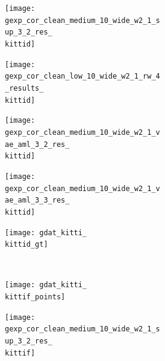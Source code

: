 \begin{figure}[t]
{\begin{subfigure}[t]{0.5\textwidth}
\begin{subfigure}[t]{0.15\textwidth}
			\vspace{0px}\centering
			\texttt{[image: gexp\_cor\_clean\_medium\_10\_wide\_w2\_1\_sup\_3\_2\_res\_\\kittid]}
		\end{subfigure}
		\begin{subfigure}[t]{0.15\textwidth}
			\vspace{0px}\centering
			\texttt{[image: gexp\_cor\_clean\_low\_10\_wide\_w2\_1\_rw\_4\_results\_\\kittid]}
		\end{subfigure}
		\begin{subfigure}[t]{0.15\textwidth}
			\vspace{0px}\centering
			\texttt{[image: gexp\_cor\_clean\_medium\_10\_wide\_w2\_1\_vae\_aml\_3\_2\_res\_\\kittid]}
		\end{subfigure}
		\begin{subfigure}[t]{0.15\textwidth}
			\vspace{0px}\centering
			\texttt{[image: gexp\_cor\_clean\_medium\_10\_wide\_w2\_1\_vae\_aml\_3\_3\_res\_\\kittid]}
		\end{subfigure}
		\begin{subfigure}[t]{0.15\textwidth}
			\vspace{0px}\centering
			\texttt{[image: gdat\_kitti\_\\kittid\_gt]}
		\end{subfigure}
		\\ %
		\begin{subfigure}[t]{0.15\textwidth}
			\vspace{0px}\centering
			\texttt{[image: gdat\_kitti\_\\kittif\_points]}
		\end{subfigure}
		\begin{subfigure}[t]{0.15\textwidth}
			\vspace{0px}\centering
			\texttt{[image: gexp\_cor\_clean\_medium\_10\_wide\_w2\_1\_sup\_3\_2\_res\_\\kittif]}
		\end{subfigure}
		\begin{subfigure}[t]{0.15\textwidth}

\end{subfigure}
\end{subfigure}}
\end{figure}
